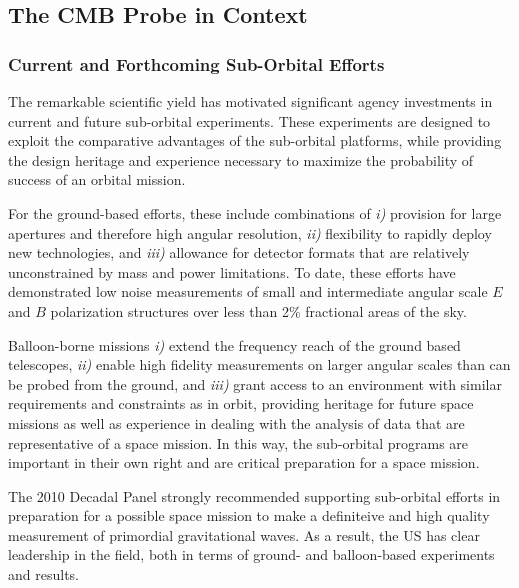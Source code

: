 
\subsection{The CMB Probe in Context}
\label{sec:spacemission}

\vspace{-0.05in}

\subsubsection{Current and Forthcoming Sub-Orbital Efforts}

The remarkable scientific yield has motivated significant agency investments 
in current and future sub-orbital experiments. 
These experiments are designed 
to exploit the comparative advantages of the sub-orbital platforms, while providing the design heritage and 
experience necessary to maximize the probability of success of an orbital mission. 

For the ground-based efforts, these include combinations of {\it i)}
provision for large apertures and therefore high angular
resolution, {\it ii)} flexibility to rapidly deploy new technologies, and {\it iii)}
allowance for detector formats that are relatively unconstrained by
mass and power limitations.  To date, these efforts have demonstrated low
noise measurements of small and intermediate angular scale $E$ and $B$ polarization 
structures over less than 2\% fractional areas of the sky. 

Balloon-borne missions {\it i)} extend the frequency reach of the ground based telescopes, 
{\it ii)} enable high fidelity measurements on larger angular scales than can be probed from the 
ground, and {\it iii)} grant access to an environment with similar requirements and constraints
as in orbit, providing heritage for future space missions as well as experience in dealing with the 
analysis of data that are representative of a space mission. In this way, the sub-orbital programs are 
important in their own right and are critical preparation for a space mission.

The 2010 Decadal Panel strongly recommended supporting sub-orbital efforts in preparation 
for a possible space mission to make a definiteive and high quality measurement of primordial gravitational waves. 
As a result, the US has clear leadership in the field, both in terms of ground- and balloon-based 
experiments and results. 

